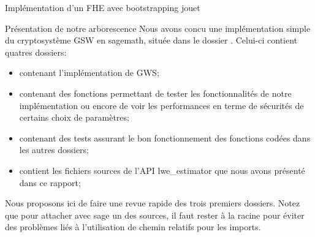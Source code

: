\begin{section}{Implémentation d'un FHE avec bootstrapping \og{} jouet\fg{}}
\begin{subsection}{Présentation de notre arborescence}
Nous avons concu une implémentation simple 
du cryptosystème GSW en sagemath, située dans le dossier
. Celui-ci contient quatres dossiers:
\begin{itemize}
\item {} contenant l'implémentation de GWS;
\item {} contenant des fonctions permettant 
	de tester les fonctionnalités de notre implémentation 
	ou encore de voir les performances 
	en terme de sécurités de certains choix de paramètres;
\item {} contenant des tests assurant le bon fonctionnement
	des fonctions codées dans les autres dossiers; 
\item {} contient les fichiers sources de l'API
	lwe\_estimator que nous avons présenté dans ce rapport; 
\end{itemize}

Nous proposons ici de faire une revue rapide des trois premiers dossiers. Notez que pour
\og attacher \fg avec sage un des sources, il faut rester à la racine pour
éviter des problèmes liés à l'utilisation de chemin relatifs pour les imports.



\end{subsection}
\end{section}
